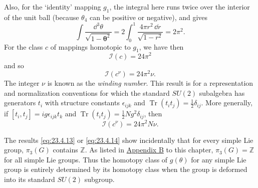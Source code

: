 Also, for the `identity' mapping $g_1$, the integral here runs twice over
the interior of the unit ball (because $\theta_4$ can be positive or
negative), and gives
\[
\int\frac{\dd^3\theta}{\sqrt{1-\boldsymbol{\theta}^2}}
=2\int_0^1\frac{4\pi r^2\,\dd r}{\sqrt{1-r^2}}=2\pi^2.
\]
For the class $c$ of mappings homotopic to $g_1$, we have then
\begin{equation}
\mathcal I(c)=24\pi^2
\tag{23.4.12}\label{eq:23.4.12}
\end{equation}
and so
\begin{equation}
\mathcal I(c^\nu)=24\pi^2\nu.
\tag{23.4.13}\label{eq:23.4.13}
\end{equation}
The integer $\nu$ is known as the \emph{winding number}. This result is
for a representation and normalization conventions for which the
standard $SU(2)$ subalgebra has generators $t_i$ with structure constants
$\epsilon_{ijk}$ and $\operatorname{Tr}(t_it_j)=\frac12\delta_{ij}$. More
generally, if $[t_i,t_j]=ig\epsilon_{ijk}t_k$ and
$\operatorname{Tr}(t_it_j)=\frac12Ng^2\delta_{ij}$, then
\begin{equation}
\mathcal I(c^\nu)=24\pi^2N\nu.
\tag{23.4.14}\label{eq:23.4.14}
\end{equation}

The results \eqref{eq:23.4.13} or \eqref{eq:23.4.14} show incidentally
that for every simple Lie group, $\pi_3(G)$ contains $\mathbb{Z}$. As listed in
\hyperref[app:23.B]{Appendix B} to this chapter, $\pi_3(G)=\mathbb{Z}$ for all simple Lie groups. Thus
the homotopy class of $g(\theta)$ for any simple Lie group is entirely
determined by its homotopy class when the group is deformed into its
standard $SU(2)$ subgroup.
